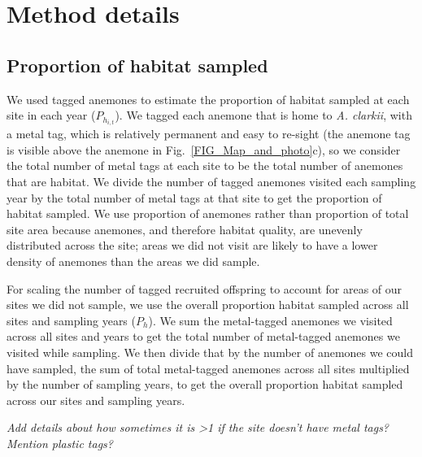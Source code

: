 \documentclass[12pt, oneside]{article}   	%
\begin{document}
\section{Method details}

\subsection{Proportion of habitat sampled} \label{APP_SEC_ProbHabSampled}

We used tagged anemones to estimate the proportion of habitat sampled at each site in each year ($P_{h_{i,t}}$). We tagged each anemone that is home to \textit{A. clarkii}, with a metal tag, which is relatively permanent and easy to re-sight (the anemone tag is visible above the anemone in Fig.\ \ref{FIG_Map_and_photo}c), so we consider the total number of metal tags at each site to be the total number of anemones that are habitat. We divide the number of tagged anemones visited each sampling year by the total number of metal tags at that site to get the proportion of habitat sampled. We use proportion of anemones rather than proportion of total site area because anemones, and therefore habitat quality, are unevenly distributed across the site; areas we did not visit are likely to have a lower density of anemones than the areas we did sample.

For scaling the number of tagged recruited offspring to account for areas of our sites we did not sample, we use the overall proportion habitat sampled across all sites and sampling years ($P_h$). We sum the metal-tagged anemones we visited across all sites and years to get the total number of metal-tagged anemones we visited while sampling. We then divide that by the number of anemones we could have sampled, the sum of total metal-tagged anemones across all sites multiplied by the number of sampling years, to get the overall proportion habitat sampled across our sites and sampling years.

\textit{Add details about how sometimes it is >1 if the site doesn't have metal tags? Mention plastic tags?}
\end{document}
